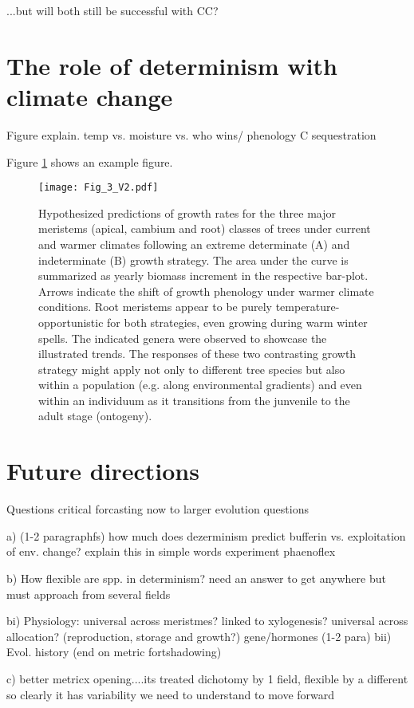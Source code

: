 \documentclass{article}
\begin{document}
	...but will both still be successful with CC?
	
\section*{The role of determinism with climate change }
	Figure explain. temp vs. moisture vs. who wins/ phenology
	C sequestration
	
			Figure \ref{fig:fig_3xxx} shows an example figure.
	
								\begin{figure}
								\centering
								\texttt{[image: Fig\_3\_V2.pdf]} 
								\caption{Hypothesized predictions of growth rates for the three major meristems (apical, cambium and root) classes of trees under current and warmer climates following an extreme determinate (A) and indeterminate (B) growth strategy. The area under the curve is summarized as yearly biomass increment in the respective bar-plot. Arrows indicate the shift of growth phenology under warmer climate conditions. Root meristems appear to be purely temperature-opportunistic for both strategies, even growing during warm winter spells. The indicated genera were observed to showcase the illustrated trends. The responses of these two contrasting growth strategy might apply not only to different tree species but also within a population (e.g. along environmental gradients) and even within an individuum as it transitions from the junvenile to the adult stage (ontogeny).}
								\label{fig:fig_3xxx}
							\end{figure}
	
\section*{Future directions}
	Questions critical forcasting now to larger evolution questions
	
	a) (1-2 paragraphfs) how much does dezerminism predict bufferin vs. exploitation of env. change?
	explain this in simple words
	experiment phaenoflex
	
	b) How flexible are spp. in determinism?
	need an answer to get anywhere but must approach from several fields
	
	bi) Physiology: universal across meristmes? linked to xylogenesis?
	universal across allocation? (reproduction, storage and growth?)
	gene/hormones (1-2 para)
	bii) Evol. history (end on metric fortshadowing)
	
	c) better metricx
	opening....its treated dichotomy by 1 field, flexible by a different so clearly it has variability we need to understand to move forward
	
\end{document}

